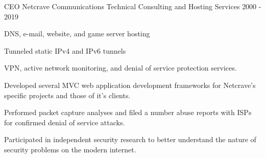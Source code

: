 \begin{cventries}
  \cventry
    {CEO}
    {Netcrave Communications}
    {Technical Consulting and Hosting Services}
    {2000 - 2019}
    {
      \begin{cvitems} 
        \item{DNS, e-mail, website, and game server hosting}
        \item{Tunneled static IPv4 and IPv6 tunnels}
        \item{VPN, active network monitoring, and denial of service protection services.}
        \item{Developed several MVC web application development frameworks for Netcrave's specific projects and those of it's clients.}
        \item{Performed packet capture analyses and filed a number abuse reports with ISPs for confirmed denial of service attacks.}
        \item{Participated in independent security research to better understand the nature of security problems on the modern internet.}
      \end{cvitems}
    }
\end{cventries}
